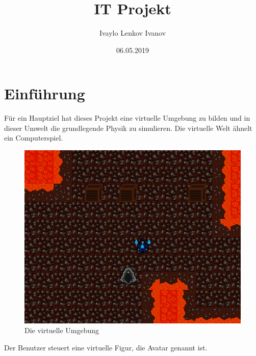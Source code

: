\documentclass[
  10pt,
  a4paper,
  oneside,
  headers,
  headinclude,
  footinclude,
  BCOR5mm,
]{article}
\title{IT Projekt}
\date{06.05.2019}
\author{Ivaylo Lenkov Ivanov}
\begin{document}
\begin{titlepage}
  \maketitle
  \tableofcontents
  \pagebreak
  \listoffigures
\end{titlepage}

\justify
\section{Einführung}
Für ein Hauptziel hat dieses Projekt eine virtuelle Umgebung zu bilden und in
dieser Umwelt die grundlegende Physik zu simulieren. Die virtuelle Welt ähnelt
ein Computerspiel.

\begin{figure}[h]
  \centering
  \includegraphics[scale=0.25]{VirtualEnvironment}
  \caption{Die virtuelle Umgebung}
  \label{fig:Umgebung}
\end{figure}

\justify
Der Benutzer steuert eine virtuelle Figur, die Avatar genannt ist.
\end{document}
